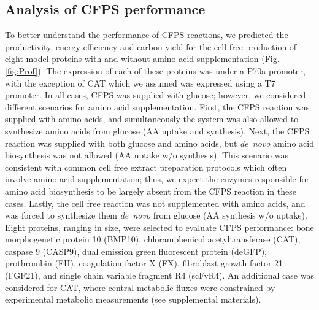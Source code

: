 \documentclass[journal=asbcd6,manuscript=article]{achemso}
\begin{document}
\subsection{Analysis of CFPS performance}
To better understand the performance of CFPS reactions, we predicted the productivity, energy efficiency and carbon yield for the cell free production of eight model proteins with and without amino acid supplementation (Fig. \ref{fig:Prof}).
The expression of each of these proteins was under a P70a promoter, with the exception of CAT which we assumed was expressed using a T7 promoter.
In all cases, CFPS was supplied with glucose; however, we considered different scenarios for amino acid supplementation.
First, the CFPS reaction was supplied with amino acids, and simultaneously the system was also allowed to synthesize amino acids from glucose (AA uptake and synthesis).
Next, the CFPS reaction was supplied with both glucose and amino acids, but \textit{de~novo} amino acid biosynthesis was not allowed (AA uptake w/o synthesis).
This scenario was consistent with common cell free extract preparation protocols which often involve amino acid supplementation; thus, we expect the enzymes responsible for amino acid biosynthesis to be largely absent from the CFPS reaction in these cases.
Lastly, the cell free reaction was not supplemented with amino acids, and was forced to synthesize them \textit{de~novo} from glucose (AA synthesis w/o uptake).
Eight proteins, ranging in size, were selected to evaluate CFPS performance: bone morphogenetic protein 10 (BMP10),
chloramphenicol acetyltransferase (CAT), caspase 9 (CASP9), dual emission green fluorescent protein (deGFP),
prothrombin (FII), coagulation factor X (FX), fibroblast growth factor 21 (FGF21), and single chain variable fragment R4 (scFvR4).
An additional case was considered for CAT, where central metabolic fluxes were constrained by experimental metabolic measurements (see supplemental materials).
\end{document}
